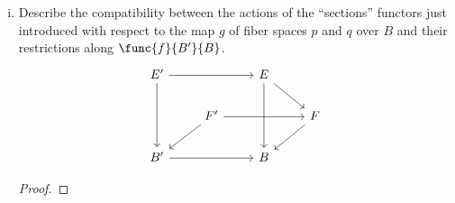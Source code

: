 \documentclass[main.tex]{subfiles}
\begin{document}
\begin{exercise}
\begin{enumerate}[(i),resume]
\begin{proof}
				For morphisms $\qty{f',g'}$  and $\qty{f,g}$ such that
				$\qty{f,g} \cdot \qty{f',g'}$ makes sense, if $s \in \Sect p$
				with $ \sm_{\qty{f,g}}\qty{s} = s'$ and $
				\sm_{\qty{f',g'}}\qty{s'} = s''$, then $s \cdot g = f \cdot
				s'$ and $s' \cdot g' = f' \cdot s''$ by the universal property
				of pullbacks $\qty{f',g'}$  and $\qty{f,g}$. We get that $s
				\cdot g \cdot g' = f \cdot s' \cdot g' = f \cdot f' \cdot s'' $.
				Since $s''$ is a section of $p''$ this allows the following
				diagram to commute:
				\[\begin{tikzcd}
					B \ar[drr, bend left, "s \cdot g \cdot g' "]
					\ar[ddr, bend right, "1_{B''}"]
					\ar[dr, dotted, "s''" description] & & \\ &
					E'' \ar[r, "f \cdot f'"] \ar[d, "p''"] \ar[dr, phantom,
					"\lrcorner", very near start] &
					E \ar[d, "p"] \\ & B'' \ar[r,"g \cdot g'"] & B
				\end{tikzcd}\]
				showing that $ s'' =
				\sm_{\qty{f',g'}}\qty{\sm_{\qty{f,g}}\qty{s}} =
				\sm_{\qty{f,g}\cdot \qty{f',g'}}\qty{s} $ for all $s \in
				\Sect p$. Thus, $\sm_{\qty{f,g}\cdot \qty{f',g'}} =
				\sm_{\qty{f',g'}} \cdot \sm_{\qty{f,g}}$. This shows that
				$\Sect$ preserves composition. Therefore, $\Sect$ is a functor.
			\end{proof}

		\item Describe the compatibility between the actions of the ``sections''
			functors just introduced with respect to the map \(g\) of fiber
			spaces \(p\) and \(q\) over \(B\) and their restrictions along
			\(\func{f}{B'}{B}\).
			\[\begin{tikzcd}
					E' \ar[rr] \ar[dd] && E \ar[dd] \ar[dr] \\ &
					F' \ar[rr] \ar[dl] && F \ar[dl] \\
					B' \ar[rr] && B
			\end{tikzcd}\]
			\begin{proof}
			\end{proof}
	\end{enumerate}
\end{exercise}
\end{document}
